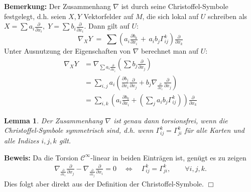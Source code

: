 \documentclass[12pt,a4paper]{article}
\newtheorem{Lemma}{Lemma}[section]
\def\proof{\noindent\textbf{Beweis:}\quad}
\def\qed{\quad\hfill\ensuremath{\Box}}
\begin{document}
\bigskip

{\bf Bemerkung:}
Der Zusammenhang $\nabla$ ist durch seine Christoffel-Symbole festgelegt, d.h.
seien $X, Y$ Vektorfelder auf $M$, die sich lokal auf $U$ schreiben als
$
X = \sum a_i \tfrac{\partial }{\partial x_i}, \; 
Y = \sum b_i \tfrac{\partial }{\partial x_i} 
$.
Dann gilt auf $U$:
$$
\nabla_XY \;=\; \sum \left( a_i \tfrac{\partial b_k}{\partial x_i}
\,+\,a_i b_j \Gamma^k_{ij} \right) \tfrac{\partial }{\partial x_k}
$$
Unter Ausnutzung der Eigenschaften von $\nabla$ berechnet man auf $U$:
\begin{align*}
\nabla_XY
& = 
\nabla_{ \sum a_i \tfrac{\partial }{\partial x_i} } \left( \sum b_j
\tfrac{\partial }{\partial x_j}\right)\\[1.5ex]
& = \sum_{i,j} a_i
\left(\frac{\partial b_j}{\partial x_i}\frac{\partial}{\partial x_j}+
b_j\nabla_{\tfrac{\partial}{\partial x_i}}\frac{\partial}{\partial x_j}
\right)\\
&= 
\sum_{i,k} 
\left(a_i\frac{\partial b_k}{\partial x_i} + 
\left(\sum_j a_i b_j \Gamma_{ij}^k\right)
\right)\frac{\partial}{\partial x_k}
% 
% 
\end{align*}

\bigskip

\begin{Lemma}
Der Zusammenhang $\nabla$ ist genau dann torsionsfrei, wenn die Christoffel-Symbole symmetrisch sind,
d.h. wenn $\Gamma^k_{ij} = \Gamma^k_{ji}$ f\"ur alle Karten und alle Indizes $i,j, k$ gilt. 
\end{Lemma}
\proof
Da die Torsion $\mathcal C^\infty$-linear in beiden Eintr\"agen ist, gen\"ugt es zu
zeigen
\begin{align*}
\nabla_{\frac{\partial}{\partial x_i}}\frac{\partial}{\partial x_j} - 
\nabla_{\frac{\partial}{\partial x_j}}\frac{\partial}{\partial x_i} = 0\quad
\Leftrightarrow\quad \Gamma_{ij}^k = \Gamma_{ji}^k,\qquad \forall i,j,k.
\end{align*}
Dies folgt aber direkt aus der Definition der Christoffel-Symbole.
\qed
\end{document}
